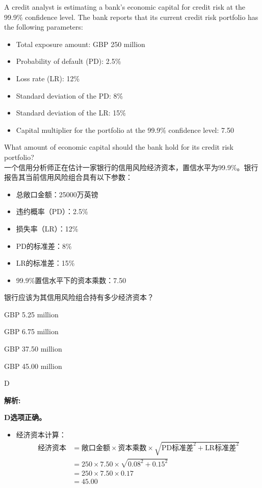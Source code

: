 \documentclass{article}
\newcounter{question} %
\newenvironment{explanation}
{\textbf{解析:}\par}
{\par}
\begin{document}
\begin{question}
    A credit analyst is estimating a bank's economic capital for credit risk at the 99.9\% confidence level. The bank reports that its current credit risk portfolio has the following parameters:
    \begin{itemize}
    \item Total exposure amount: GBP 250 million
    \item Probability of default (PD): 2.5\%
    \item Loss rate (LR): 12\%
    \item Standard deviation of the PD: 8\%
    \item Standard deviation of the LR: 15\%
    \item Capital multiplier for the portfolio at the 99.9\% confidence level: 7.50
    \end{itemize}
    What amount of economic capital should the bank hold for its credit risk portfolio?
    \\ 一个信用分析师正在估计一家银行的信用风险经济资本，置信水平为99.9\%。银行报告其当前信用风险组合具有以下参数：
    \begin{itemize}
    \item 总敞口金额：25000万英镑
    \item 违约概率（PD）：2.5\%
    \item 损失率（LR）：12\%
    \item PD的标准差：8\%
    \item LR的标准差：15\%
    \item 99.9\%置信水平下的资本乘数：7.50
    \end{itemize}
    银行应该为其信用风险组合持有多少经济资本？
\end{question}

\begin{choices}
    \item GBP 5.25 million
    \item GBP 6.75 million
    \item GBP 37.50 million
    \item GBP 45.00 million
\end{choices}

\begin{correctanswer}
    D
\end{correctanswer}

\begin{explanation}
    
    \textbf{D选项正确。}
    \begin{itemize}
        \item 经济资本计算：
        \[
        \begin{aligned}
        \text{经济资本} &= \text{敞口金额} \times \text{资本乘数} \times \sqrt{\text{PD标准差}^2 + \text{LR标准差}^2} \\
        &= 250 \times 7.50 \times \sqrt{0.08^2 + 0.15^2} \\
        &= 250 \times 7.50 \times 0.17 \\
        &= 45.00
        \end{aligned}
        \]
    \end{itemize}
\end{explanation}
\end{document}
